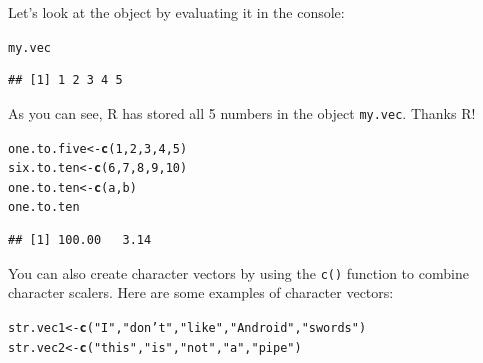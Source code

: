\documentclass{tufte-book}\usepackage[]{graphicx}\usepackage[]{color}
\makeatletter
\newcommand{\hlnum}[1]{\textcolor[rgb]{0.686,0.059,0.569}{#1}}%
\newcommand{\hlstr}[1]{\textcolor[rgb]{0.192,0.494,0.8}{#1}}%
\newcommand{\hlstd}[1]{\textcolor[rgb]{0.345,0.345,0.345}{#1}}%
\newcommand{\hlkwb}[1]{\textcolor[rgb]{0.69,0.353,0.396}{#1}}%
\newcommand{\hlkwd}[1]{\textcolor[rgb]{0.737,0.353,0.396}{\textbf{#1}}}%
\newenvironment{kframe}{%
 \def\at@end@of@kframe{}%
 \ifinner\ifhmode%
  \def\at@end@of@kframe{\end{minipage}}%
  \begin{minipage}{\columnwidth}%
 \fi\fi%
 \def\FrameCommand##1{\hskip\@totalleftmargin \hskip-\fboxsep
 \colorbox{shadecolor}{##1}\hskip-\fboxsep
     \hskip-\linewidth \hskip-\@totalleftmargin \hskip\columnwidth}%
 \MakeFramed {\advance\hsize-\width
   \@totalleftmargin\z@ \linewidth\hsize
   \@setminipage}}%
 {\par\unskip\endMakeFramed%
 \at@end@of@kframe}
\newenvironment{knitrout}{}{} %
\makeatother
\begin{document}
Let's look at the object by evaluating it in the console:

\begin{knitrout}
\color{fgcolor}\begin{kframe}
\begin{alltt}
\hlstd{my.vec}
\end{alltt}
\begin{verbatim}
## [1] 1 2 3 4 5
\end{verbatim}
\end{kframe}
\end{knitrout}

As you can see, R has stored all 5 numbers in the object \texttt{my.vec}. Thanks R!



\begin{marginfigure}

\begin{knitrout}
\color{fgcolor}\begin{kframe}
\begin{alltt}
\hlstd{one.to.five} \hlkwb{<-} \hlkwd{c}\hlstd{(}\hlnum{1}\hlstd{,} \hlnum{2}\hlstd{,} \hlnum{3}\hlstd{,} \hlnum{4}\hlstd{,} \hlnum{5}\hlstd{)}
\hlstd{six.to.ten} \hlkwb{<-} \hlkwd{c}\hlstd{(}\hlnum{6}\hlstd{,} \hlnum{7}\hlstd{,} \hlnum{8}\hlstd{,} \hlnum{9}\hlstd{,} \hlnum{10}\hlstd{)}
\hlstd{one.to.ten} \hlkwb{<-} \hlkwd{c}\hlstd{(a, b)}
\hlstd{one.to.ten}
\end{alltt}
\begin{verbatim}
## [1] 100.00   3.14
\end{verbatim}
\end{kframe}
\end{knitrout}

\end{marginfigure}

You can also create character vectors by using the \texttt{c()} function to combine character scalers. Here are some examples of character vectors:

\begin{knitrout}
\color{fgcolor}\begin{kframe}
\begin{alltt}
\hlstd{str.vec1} \hlkwb{<-} \hlkwd{c}\hlstd{(}\hlstr{"I"}\hlstd{,} \hlstr{"don't"}\hlstd{,} \hlstr{"like"}\hlstd{,} \hlstr{"Android"}\hlstd{,} \hlstr{"swords"}\hlstd{)}
\hlstd{str.vec2} \hlkwb{<-} \hlkwd{c}\hlstd{(}\hlstr{"this"}\hlstd{,} \hlstr{"is"}\hlstd{,} \hlstr{"not"}\hlstd{,} \hlstr{"a"}\hlstd{,} \hlstr{"pipe"}\hlstd{)}
\end{alltt}
\end{kframe}
\end{knitrout}
\end{document}
